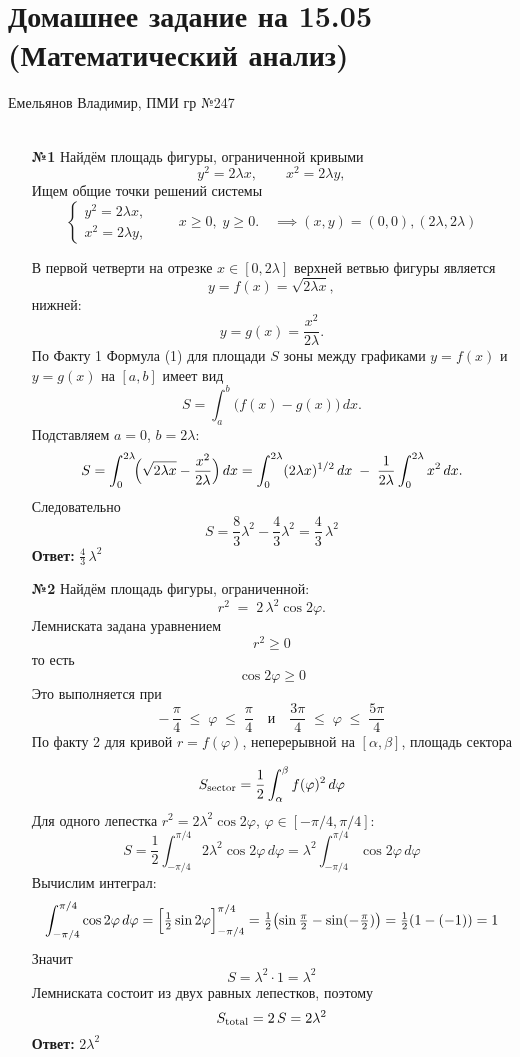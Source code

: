 \documentclass[a4paper]{article}
\begin{document}
\section*{Домашнее задание на 15.05 (Математический анализ)}
{\large Емельянов Владимир, ПМИ гр №247}\\\\
\begin{enumerate}
  \item[\textbf{№1}]
  Найдём площадь фигуры, ограниченной кривыми
  $$
  y^2 = 2\lambda x,
  \qquad
  x^2 = 2\lambda y,
  $$
  Ищем общие точки решений системы
  $$
  \begin{cases}
  y^2 = 2\lambda x,\\
  x^2 = 2\lambda y,
  \end{cases}
  \qquad x\ge0,\;y\ge0.
  \quad \implies (x, y) = (0, 0), (2\lambda, 2\lambda)$$
  
  В первой четверти на отрезке $x\in[0,2\lambda]$ верхней ветвью фигуры является
  $$
  y=f(x)=\sqrt{2\lambda x},
  $$
  нижней:
  $$
  y=g(x)=\frac{x^2}{2\lambda}.
  $$
  По Факту 1 Формула (1) для площади $S$ зоны между графиками $y=f(x)$ и $y=g(x)$ на $[a,b]$ имеет вид
  $$
  S=\int_a^b\bigl(f(x)-g(x)\bigr)\,dx.
  $$
  Подставляем $a=0$, $b=2\lambda$:
  $$
  S=\int_0^{2\lambda}\!\Bigl(\sqrt{2\lambda x}-\frac{x^2}{2\lambda}\Bigr)\,dx
  =\int_0^{2\lambda}(2\lambda x)^{1/2}\,dx\;-\;\frac1{2\lambda}\int_0^{2\lambda}x^2\,dx.
  $$
  Следовательно
  $$
  S=\frac{8}{3}\lambda^2-\frac{4}{3}\lambda^2
  =\frac{4}{3}\,\lambda^2
  $$
  \textbf{Ответ: }$\frac{4}{3}\,\lambda^2$\\

  \item[\textbf{№2}]
  Найдём площадь фигуры, ограниченной:
  $$
  r^2 \;=\; 2\,\lambda^2\cos2\varphi.
  $$
  Лемниската задана уравнением 
  $$r^2\ge0$$
  то есть 
  $$\cos2\varphi\ge0$$
  Это выполняется при
  $$
  -\,\frac\pi4\;\le\;\varphi\;\le\;\frac\pi4
  \quad\text{и}\quad
  \frac{3\pi}4\;\le\;\varphi\;\le\;\frac{5\pi}4
  $$
  По факту 2 для кривой $r=f(\varphi)$, непер­ерывной на $[\alpha,\beta]$, площадь сектора

  $$
  S_{\rm sector}
  =\frac12\int_{\alpha}^{\beta}f(\varphi)^2\,d\varphi
  $$
  Для одного лепестка \(r^2=2\lambda^2\cos2\varphi\), \(\varphi\in[-\pi/4,\pi/4]\):  
  $$
  S
  =\frac12\int_{-\pi/4}^{\pi/4}2\lambda^2\cos2\varphi\,d\varphi
  =\lambda^2\int_{-\pi/4}^{\pi/4}\cos2\varphi\,d\varphi
  $$
  Вычислим интеграл:
  $$
  \int_{-\pi/4}^{\pi/4}\cos2\varphi\,d\varphi
  =\Bigl[\tfrac12\sin2\varphi\Bigr]_{-\pi/4}^{\pi/4}
  =\tfrac12\bigl(\sin\tfrac\pi2-\sin(-\tfrac\pi2)\bigr)
  =\tfrac12(1-(-1))=1
  $$
  Значит
  $$
  S=\lambda^2\cdot1=\lambda^2
  $$
  Лемниската состоит из двух равных лепестков, поэтому
  $$
  S_{\rm total}=2\,S=2\lambda^2
  $$
  \textbf{Ответ: } $2\lambda^2$\\


\end{enumerate}
\end{document}
